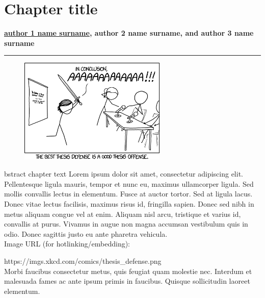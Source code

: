 %
%
\chapter{Chapter title}
\vspace{-0.7cm}


\begin{center}
\textbf{\underline{author 1 name surname}, author 2 name surname, and author 3 
name surname}
\end{center}

\vspace{-0.5cm}

\noindent \rule{\textwidth}{0.5pt}
\vspace{-0.5cm}

\begin{figure}
\centering
\includegraphics[width=7cm] 
{chapters/chapter-template/fig-template/thesisdefense.png}
\end{figure}
\color{gray} \color{black}bstract chapter text
 Lorem ipsum dolor sit amet, consectetur adipiscing elit. Pellentesque ligula 
mauris, tempor et nunc eu, maximus ullamcorper ligula. Sed mollis convallis 
lectus in elementum. Fusce at auctor tortor. Sed at ligula lacus. Donec vitae 
lectus facilisis, maximus risus id, fringilla sapien. Donec sed nibh in metus 
aliquam congue vel at enim. Aliquam nisl arcu, tristique et varius id, convallis 
at purus. Vivamus in augue non magna accumsan vestibulum quis in odio. Donec 
sagittis justo eu ante pharetra vehicula.\\

Image URL (for hotlinking/embedding): 

https://imgs.xkcd.com/comics/thesis\_defense.png\\

Morbi faucibus consectetur metus, quis feugiat quam molestie nec. Interdum et 
malesuada fames ac ante ipsum primis in faucibus. Quisque sollicitudin laoreet 
elementum. 

